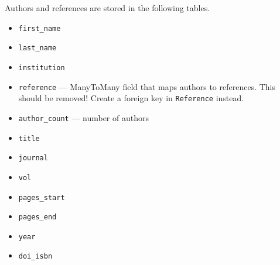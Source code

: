 \documentclass{article}
\begin{document}
Authors and references are stored in the following tables.
\begin{tcolorbox}[colback=green!5,colframe=green!40!black,title=Author(Base)]
  \begin{itemize}
  \item \texttt{first\_name}
  \item \texttt{last\_name}
  \item \texttt{institution}
  \item \texttt{reference} --- ManyToMany field that maps authors to references. This should be removed! Create a foreign key in \texttt{Reference} instead.
  \end{itemize}
\end{tcolorbox}
\begin{tcolorbox}[colback=green!5,colframe=green!40!black,title=Reference(Base)]
  \begin{itemize}
  \item \texttt{author\_count} --- number of authors
  \item \texttt{title}
  \item \texttt{journal}
  \item \texttt{vol}
  \item \texttt{pages\_start}
  \item \texttt{pages\_end}
  \item \texttt{year}
  \item \texttt{doi\_isbn}
  \end{itemize}
\end{tcolorbox}
\end{document}
